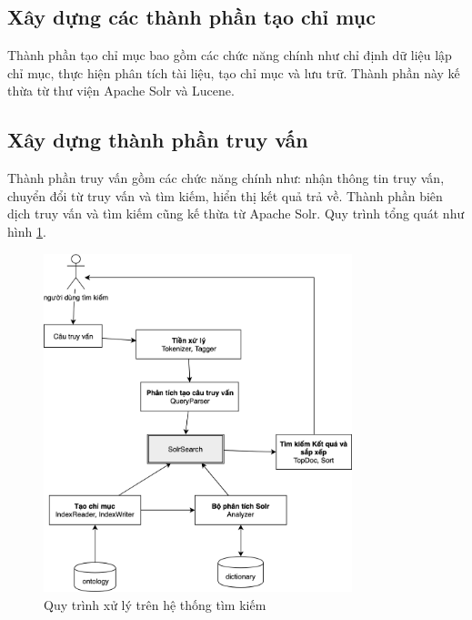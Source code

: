 \subsection{Xây dựng các thành phần tạo chỉ mục}
Thành phần tạo chỉ mục bao gồm các chức năng chính như chỉ định dữ liệu lập chỉ mục, thực hiện phân tích tài liệu, tạo chỉ mục và lưu trữ. Thành phần này kế thừa từ thư viện Apache Solr và Lucene. 

\subsection{Xây dựng thành phần truy vấn}

Thành phần truy vấn gồm các chức năng chính như: nhận thông tin truy vấn, chuyển đổi từ truy vấn và tìm kiếm, hiển thị kết quả trả về. Thành phần biên dịch truy vấn và tìm kiếm cũng kế thừa từ Apache Solr. Quy trình tổng quát như hình \ref{fig:mo_hinh_tim_kiem}.


   \begin{figure}[H]
        \centering
        \includegraphics[width=0.8\textwidth]{img/so_do_he_thong.png}
        \caption{Quy trình xử lý trên hệ thống tìm kiếm}
        \label{fig:mo_hinh_tim_kiem}
    \end{figure}
    
